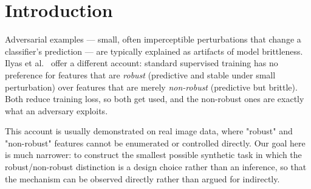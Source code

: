 \documentclass[11pt]{article}
\begin{document}
\begin{abstract}
is a seed-dependent knife-edge collapse rather than a fixed threshold, which
a single-seed evaluation would not have revealed. Because the generative
model is fully known, we also derive the exact Bayes-optimal classifier
and find the trained network relies on the jointly-informative but
individually-weak dimensions \emph{less} than is statistically optimal,
not more. An appendix subjects the main text's remaining choices to
broader checks: a multi-step PGD attack, a phase diagram over generative
and regularization parameters, a comparison against
$L_2$/group-Lasso/elastic-net/pruning alternatives, and an image
architecture with genuine per-cue channel separation rather than post-hoc
spatial masking. Code for all experiments is provided.
\end{abstract}

\section{Introduction}

Adversarial examples --- small, often imperceptible perturbations that
change a classifier's prediction --- are typically explained as artifacts of
model brittleness. Ilyas et al.\ \cite{ilyas2019} offer a different
account: standard supervised training has no preference for features that
are \emph{robust} (predictive and stable under small perturbation) over
features that are merely \emph{non-robust} (predictive but brittle). Both
reduce training loss, so both get used, and the non-robust ones are exactly
what an adversary exploits.

This account is usually demonstrated on real image data, where "robust" and
"non-robust" features cannot be enumerated or controlled directly. Our goal
here is much narrower: to construct the smallest possible synthetic task in
which the robust/non-robust distinction is a design choice rather than an
inference, so that the mechanism can be observed directly rather than
argued for indirectly.
\end{document}
